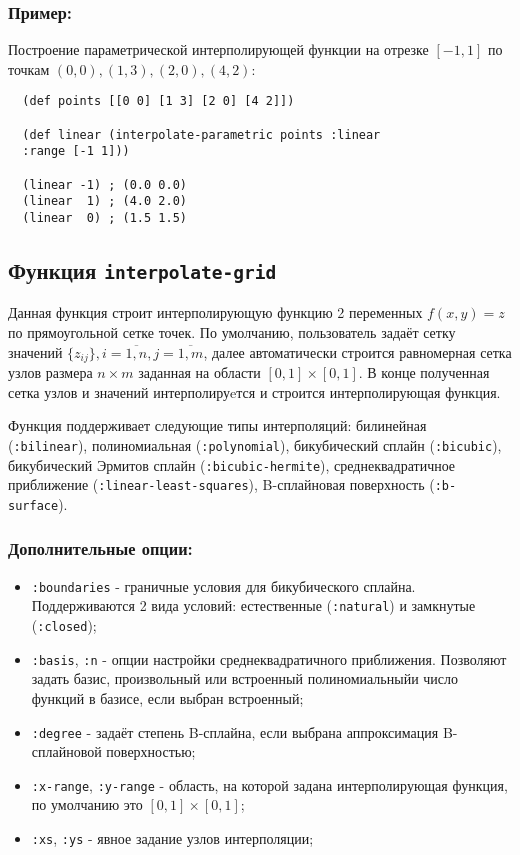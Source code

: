 \subsubsection{Пример:}

Построение параметрической интерполирующей функции на отрезке $[-1, 1]$ по точкам $(0, 0), (1, 3), (2, 0), (4, 2)$:

\begin{verbatim}
  (def points [[0 0] [1 3] [2 0] [4 2]])

  (def linear (interpolate-parametric points :linear
  :range [-1 1]))

  (linear -1) ; (0.0 0.0)
  (linear  1) ; (4.0 2.0)
  (linear  0) ; (1.5 1.5)
\end{verbatim}


\subsection{Функция \texttt{interpolate-grid}}

Данная функция строит интерполирующую функцию 2 переменных $f(x, y) = z$ по прямоугольной сетке точек. По умолчанию, пользователь задаёт сетку значений $\{z_{ij}\}, i=\overline{1, n}, j=\overline{1, m}$, далее автоматически строится равномерная сетка узлов размера $n \times m$ заданная на области $[0, 1] \times [0, 1]$. В конце полученная сетка узлов и значений интерполируeтся и строится интерполирующая функция.

Функция поддерживает следующие типы интерполяций: билинейная \\ (\texttt{:bilinear}), полиномиальная (\texttt{:polynomial}), бикубический сплайн (\texttt{:bicubic}), бикубический Эрмитов сплайн (\texttt{:bicubic-hermite}), среднеквадратичное приближение (\texttt{:linear-least-squares}), B-сплайновая поверхность (\texttt{:b-surface}).

\subsubsection{Дополнительные опции:}

\begin{itemize}
\item \texttt{:boundaries} - граничные условия для бикубического сплайна. Поддерживаются 2 вида условий: естественные (\texttt{:natural})
                             и замкнутые (\texttt{:closed});
\item \texttt{:basis}, \texttt{:n} - опции настройки среднеквадратичного приближения. Позволяют задать базис, произвольный или встроенный полиномиальныйи число функций в базисе, если выбран встроенный;
\item \texttt{:degree} - задаёт степень B-сплайна, если выбрана аппроксимация B-сплайновой поверхностью;
\item \texttt{:x-range}, \texttt{:y-range} - область, на которой задана интерполирующая функция, по умолчанию это $[0, 1] \times [0, 1]$;
\item \texttt{:xs}, \texttt{:ys} - явное задание узлов интерполяции;
\end{itemize}

